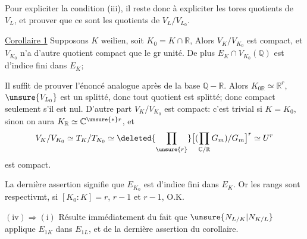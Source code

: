 Pour expliciter la condition (iii), il reste donc à expliciter les tores
quotients  de  $V_L$, et
prouver que ce sont les quotients de $V_L/V_{L_0}$.



\uline{Corollaire 1} Supposons $K$ weilien, soit $K_0=K\cap\mathbb R$,
 Alors $V_K/V_{K_0}$ est compact, et $V_{K_0}$ n'a d'autre
 quotient compact que le gr unité.
De plus $E_K\cap V_{K_0}(\mathbb Q)$ est d'indice fini dans $E_K$;

Il suffit  de prouver l'énoncé analogue
après  de la base $\mathbb Q-\mathbb R$.
Alors $K_{0\mathbb R}\simeq\mathbb R^r$, 
$\unsure{V_{L_0}}$ est un  splitté, donc tout quotient est splitté;
donc compact seulement s'il est  nul.
D'autre part $V_K/V_{K_0}$ est compact: c'est trivial si $K=K_0$,
sinon on aura $K_{\mathbb R}\simeq\mathbb C^{\unsure{*}r}$, et
\[
V_K/V_{K_0}\simeq T_K/T_{K_0}\simeq
\deleted{\prod_{\unsure{r}}}
\bigl[(\prod_{\mathbb C/\mathbb R}G_m)/G_m\bigr]^r\simeq U^r
\]
est compact.

La dernière assertion signifie  que $E_{K_0}$ est d'indice
fini dans $E_K$. Or les rangs sont respectivmt, si $[K_0:K]=r$,
$r-1$ et $r-1$, O.K.

$(\mathrm{iv})\Longrightarrow(\mathrm{i})$ Résulte immédiatement du fait que
$\unsure{N_{L/K}|N_{K/L}}$ applique $E_{1K}$ dans $E_{1L}$, et de la dernière
assertion du corollaire.
